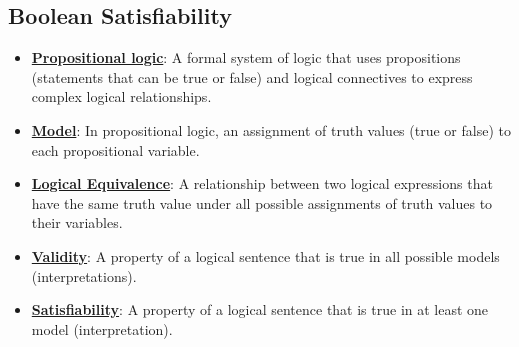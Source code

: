\documentclass{article}%
\begin{document}
\subsection{Boolean Satisfiability}%
\label{subsec:BooleanSatisfiability}%
\begin{itemize}[leftmargin=*]%
\item \href{https://purdue.brightspace.com/d2l/common/assets/pdfjs-d2l-dist/1.0.14-legacy/web/viewer.html?file=\%2Fcontent\%2Fenforced\%2F1095467-wl.202510.CS.24300.001\%2F13L1-Logic.pdf\%3Fou\%3D1095467\&lang=en-us\&container=d2l-fileviewer-rendered-pdf\&fullscreen=d2l-fileviewer-rendered-pdf-dialog\&height=667#page=8}{\textbf{Propositional logic}}: A formal system of logic that uses propositions (statements that can be true or false) and logical connectives to express complex logical relationships.%
\item \href{https://purdue.brightspace.com/d2l/common/assets/pdfjs-d2l-dist/1.0.14-legacy/web/viewer.html?file=\%2Fcontent\%2Fenforced\%2F1095467-wl.202510.CS.24300.001\%2F13L1-Logic.pdf\%3Fou\%3D1095467\&lang=en-us\&container=d2l-fileviewer-rendered-pdf\&fullscreen=d2l-fileviewer-rendered-pdf-dialog\&height=667#page=9}{\textbf{Model}}: In propositional logic, an assignment of truth values (true or false) to each propositional variable.%
\item \href{https://purdue.brightspace.com/d2l/common/assets/pdfjs-d2l-dist/1.0.14-legacy/web/viewer.html?file=\%2Fcontent\%2Fenforced\%2F1095467-wl.202510.CS.24300.001\%2F13L1-Logic.pdf\%3Fou\%3D1095467\&lang=en-us\&container=d2l-fileviewer-rendered-pdf\&fullscreen=d2l-fileviewer-rendered-pdf-dialog\&height=667#page=12}{\textbf{Logical Equivalence}}: A relationship between two logical expressions that have the same truth value under all possible assignments of truth values to their variables.%
\item \href{https://purdue.brightspace.com/d2l/common/assets/pdfjs-d2l-dist/1.0.14-legacy/web/viewer.html?file=\%2Fcontent\%2Fenforced\%2F1095467-wl.202510.CS.24300.001\%2F13L1-Logic.pdf\%3Fou\%3D1095467\&lang=en-us\&container=d2l-fileviewer-rendered-pdf\&fullscreen=d2l-fileviewer-rendered-pdf-dialog\&height=667#page=13}{\textbf{Validity}}: A property of a logical sentence that is true in all possible models (interpretations).%
\item \href{https://purdue.brightspace.com/d2l/common/assets/pdfjs-d2l-dist/1.0.14-legacy/web/viewer.html?file=\%2Fcontent\%2Fenforced\%2F1095467-wl.202510.CS.24300.001\%2F13L1-Logic.pdf\%3Fou\%3D1095467\&lang=en-us\&container=d2l-fileviewer-rendered-pdf\&fullscreen=d2l-fileviewer-rendered-pdf-dialog\&height=667#page=13}{\textbf{Satisfiability}}: A property of a logical sentence that is true in at least one model (interpretation).%

\end{itemize}
\end{document}

